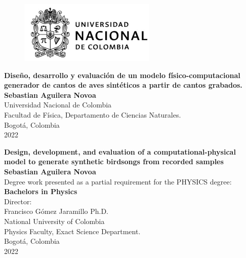 \newpage{\pagestyle{empty}\clearpage}  %
\setcounter{page}{1}
\begin{center}
\begin{figure}
\centering%
\includegraphics[width=6.5cm]{Images/logo1.jpg}
\end{figure}
\thispagestyle{empty} \vspace*{1.0cm} \textbf{\huge
Diseño, desarrollo y evaluación de un modelo físico-computacional generador de cantos de aves sintéticos a
partir de cantos grabados.}\\[4.0cm]
\Large\textbf{Sebastian Aguilera Novoa}\\[4.0cm]
\small Universidad Nacional de Colombia\\
Facultad de Física, Departamento de Ciencias Naturales.\\
Bogotá, Colombia\\
2022\\
\end{center}


\newpage
\begin{center}
\thispagestyle{empty} \vspace*{0cm} \textbf{\huge
Design, development, and evaluation of a computational-physical model to generate synthetic birdsongs from recorded samples}\\[3.0cm]
\Large\textbf{Sebastian Aguilera Novoa}\\[3.0cm]
\small Degree work presented as a partial requirement for the PHYSICS degree:\\
\textbf{Bachelors in Physics}\\[2.5cm]
Director:\\
Francisco Gómez Jaramillo Ph.D.\\[4.5cm] 

National University of Colombia\\
Physics Faculty, Exact Science Department.\\
Bogotá, Colombia\\
2022\\
\end{center}

